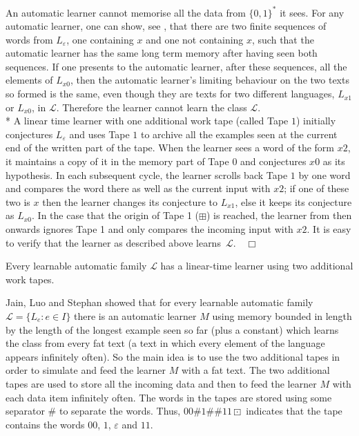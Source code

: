 \documentclass{LMCS}
\newcommand{\CalL}{{\mathcal L}}
\theoremstyle{plain}\newtheorem{athm}[thm]{Theorem}
\theoremstyle{plain}\newtheorem{aprop}[thm]{Proposition}
\theoremstyle{plain}\newtheorem{aprob}[thm]{Open Problem}
\theoremstyle{plain}\newtheorem{acor}[thm]{Corollary}
\theoremstyle{plain}\newtheorem{alem}[thm]{Lemma}
\theoremstyle{definition}\newtheorem{adefn}[thm]{Definition}
\theoremstyle{definition}\newtheorem{arem}[thm]{Remark}
\theoremstyle{plain}\newtheorem{aexmp}[thm]{Example}
\theoremstyle{plain}\newtheorem{aclm}[thm]{Claim}
\def\niceqed{~~$\Box$}
\def\sp{\\*\indent}
\begin{document}
\proof
An automatic learner cannot memorise all the data from $\{0,1\}^*$ it sees.
For any automatic learner, one can show, see \cite{JLS09}, that there
are two finite sequences
of words from $L_{\varepsilon}$, one containing $x$ and one not
containing $x$, such that the
automatic learner has the same long term memory after having seen both
sequences.
If one presents to the automatic learner, after these sequences, all
the elements
of $L_{x0}$, then the automatic learner's limiting behaviour on the
two texts so formed is the same, even though they are texts for two different
languages, $L_{x1}$ or $L_{x0}$, in $\CalL$.
Therefore the learner cannot learn the class $\CalL$.
\sp
A linear time learner with one additional work tape (called Tape $1$)
initially conjectures $L_{\varepsilon}$ and uses Tape $1$ to archive 
all the examples seen at the current end of the written part of the tape.
When the learner sees a word of the form $x2$, it maintains a copy of
it in the memory part of Tape $0$ and conjectures $x0$ as its hypothesis. 
In each subsequent cycle, the
learner scrolls back Tape $1$ by one word and compares the word there
as well as the current input with $x2$; if one of these two is $x$ then
the learner changes its conjecture to $L_{x1}$, else it keeps its
conjecture as $L_{x0}$.
In the case that the origin of Tape 1 ($\boxplus$) is reached, the learner from
then onwards ignores Tape 1 and only compares the incoming input
with $x2$.
It is easy to verify that the learner as described above learns~$\CalL$.\niceqed

\begin{thm} \label{th:twotapes}
Every learnable automatic family $\CalL$ has a linear-time learner using
two additional work tapes.
\end{thm}

\proof
Jain, Luo and Stephan \cite{JLS09} showed that for every learnable
automatic family $\CalL=\{L_e: e \in I\}$ there is an automatic
learner $M$ using memory bounded in length by the length 
of the longest example seen
so far (plus a constant) which learns the class from every fat text
(a text in which every element of the language appears infinitely often). 
So the main idea is to use the two additional tapes in order to 
simulate and feed the learner $M$ with a fat text. 
The two additional tapes are used to store all the incoming data and
then to feed the learner $M$ with each data item infinitely often.
The words in the tapes are stored using some separator $\#$ to separate
the words. Thus, $00\#1\#\#11\boxdot$ indicates that the tape
contains the words $00$, $1$, $\varepsilon$ and $11$.
\end{document}
